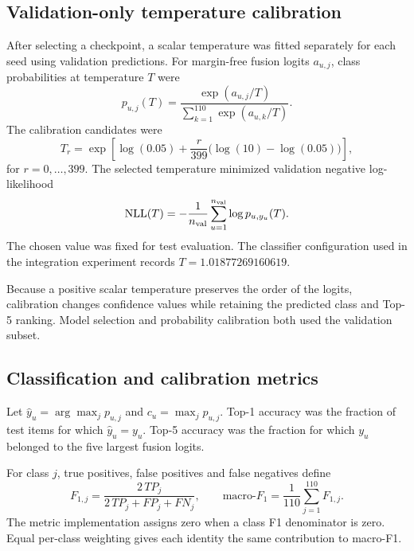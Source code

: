 \subsection{Validation-only temperature calibration}
After selecting a checkpoint, a scalar temperature was fitted separately for each seed using validation predictions. For margin-free fusion logits $a_{u,j}$, class probabilities at temperature $T$ were
\begin{equation}
 p_{u,j}(T)=
 \frac{\exp(a_{u,j}/T)}
      {\sum_{k=1}^{110}\exp(a_{u,k}/T)}.
 \label{eq:sv2-probability}
\end{equation}
The calibration candidates were
\begin{equation}
 T_r=\exp\left[
 \log(0.05)+\frac{r}{399}\bigl(\log(10)-\log(0.05)\bigr)
 \right],
 \label{eq:sv2-temperature-grid}
\end{equation}
for $r=0,\ldots,399$. The selected temperature minimized validation negative log-likelihood
\begin{equation}
 \mathrm{NLL}(T)
 =-\frac{1}{n_{\rm val}}\sum_{u=1}^{n_{\rm val}}
       \log p_{u,y_u}(T).
 \label{eq:sv2-nll}
\end{equation}
The chosen value was fixed for test evaluation. The classifier configuration used in the integration experiment records $T=1.01877269160619$.

Because a positive scalar temperature preserves the order of the logits, calibration changes confidence values while retaining the predicted class and Top-5 ranking. Model selection and probability calibration both used the validation subset.

\subsection{Classification and calibration metrics}
Let $\hat y_u=\arg\max_jp_{u,j}$ and $c_u=\max_jp_{u,j}$. Top-1 accuracy was the fraction of test items for which $\hat y_u=y_u$. Top-5 accuracy was the fraction for which $y_u$ belonged to the five largest fusion logits.

For class $j$, true positives, false positives and false negatives define
\begin{equation}
 F_{1,j}=\frac{2\,TP_j}{2\,TP_j+FP_j+FN_j},
 \qquad
 \mathrm{macro}\mbox{-}F_1=\frac{1}{110}\sum_{j=1}^{110}F_{1,j}.
 \label{eq:sv2-f1}
\end{equation}
The metric implementation assigns zero when a class F1 denominator is zero. Equal per-class weighting gives each identity the same contribution to macro-F1.

